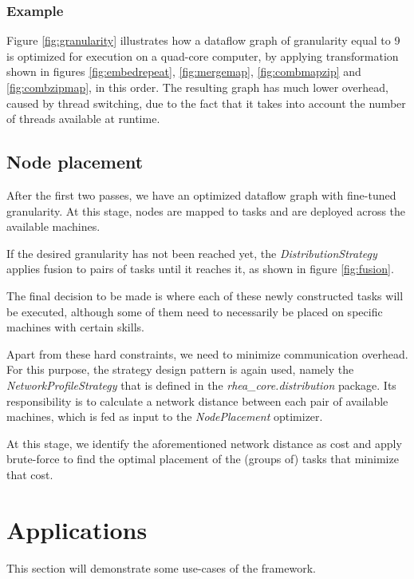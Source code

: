 \documentclass[sigplan,review,anonymous]{acmart}\settopmatter{printfolios=true,printacmref=false}
\begin{document}
\subsubsection{Example}

Figure \ref{fig:granularity} illustrates how a dataflow graph of granularity equal to 9 is optimized for execution on a quad-core computer, by applying transformation shown in figures \ref{fig:embedrepeat}, \ref{fig:mergemap}, \ref{fig:combmapzip} and \ref{fig:combzipmap}, in this order. The resulting graph has much lower overhead, caused by thread switching, due to the fact that it takes into account the number of threads available at runtime.


\subsection{Node placement}

After the first two passes, we have an optimized dataflow graph with fine-tuned granularity. At this stage, nodes are mapped to tasks and are deployed across the available machines.

If the desired granularity has not been reached yet, the \textit{DistributionStrategy} applies fusion to pairs of tasks until it reaches it, as shown in figure \ref{fig:fusion}.


The final decision to be made is where each of these newly constructed tasks will be executed, although some of them need to necessarily be placed on specific machines with certain skills.

Apart from these hard constraints, we need to minimize communication overhead. For this purpose, the strategy design pattern is again used, namely the \textit{NetworkProfileStrategy} that is defined in the \textit{rhea\_core.distribution} package. Its responsibility is to calculate a network distance between each pair of available machines, which is fed as input to the \textit{NodePlacement} optimizer.

At this stage, we identify the aforementioned network distance as cost and apply brute-force to find the optimal placement of the (groups of) tasks that minimize that cost.

\section{Applications} \label{sec:applications}
This section will demonstrate some use-cases of the framework.
\end{document}
